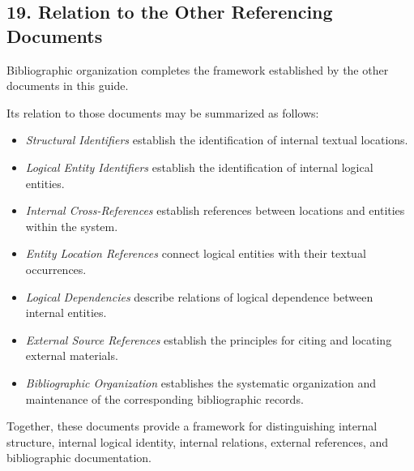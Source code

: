 
\subsection*{19. Relation to the Other
Referencing Documents}

Bibliographic organization
completes the framework
established by the
other documents in
this guide.

Its relation to those
documents may be
summarized as follows:

\begin{itemize}
    \item \textit{Structural Identifiers}
    establish the identification
    of internal textual locations.

    \item \textit{Logical Entity
    Identifiers} establish
    the identification
    of internal logical
    entities.

    \item \textit{Internal
    Cross-References}
    establish references
    between locations
    and entities within
    the system.

    \item \textit{Entity
    Location References}
    connect logical
    entities with their
    textual occurrences.

    \item \textit{Logical
    Dependencies} describe
    relations of logical
    dependence between
    internal entities.

    \item \textit{External
    Source References}
    establish the principles
    for citing and locating
    external materials.

    \item \textit{Bibliographic
    Organization} establishes
    the systematic
    organization and
    maintenance of
    the corresponding
    bibliographic records.
\end{itemize}

Together, these documents
provide a framework
for distinguishing
internal structure,
internal logical identity,
internal relations,
external references,
and bibliographic
documentation.


